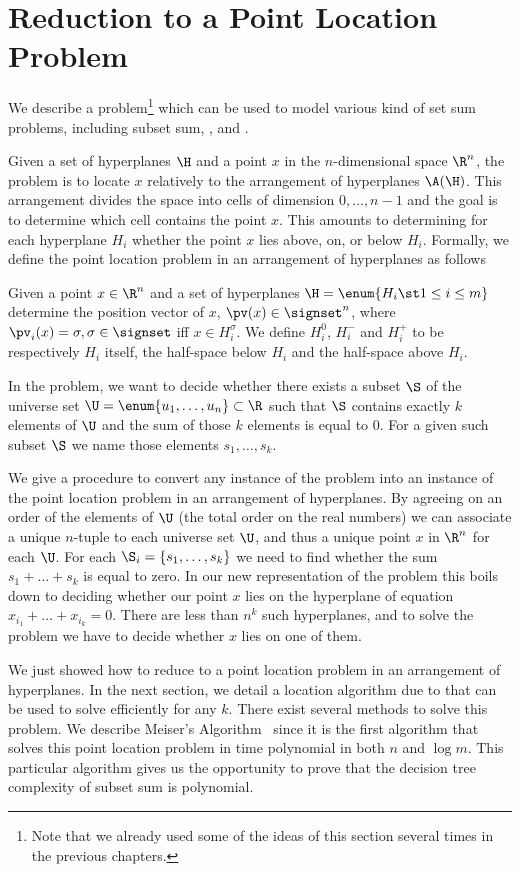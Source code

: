 \section{Reduction to a Point Location Problem}

We describe a problem\footnote{%
Note that we already used some of the ideas of this section several times in
the previous chapters.%
}
which can be used to model
various kind of set sum problems, including subset sum, \kSUM, and \kLDT.

Given a set of hyperplanes \(\H\) and a point \(x\) in the \(n\)-dimensional
space \(\R^n\), the problem is to locate \(x\) relatively
to the arrangement of hyperplanes \(\A(\H)\). This arrangement divides the space
into cells of dimension \(0,\ldots,n-1\) and the goal is to determine which
cell contains the point \(x\). This amounts to determining for each
hyperplane \(H_i\) whether the point \(x\) lies above, on, or below \(H_i\).
Formally, we define the point location problem in an arrangement of hyperplanes as
follows
\begin{problem}
Given a point $x \in \R^n$ and a set of hyperplanes $\H = \enum{ H_i
\st 1 \leq i \leq m }$ determine the position vector of $x$, $\pv(x) \in
\signset^n$, where $\pv_i(x) = \sigma, \sigma \in \signset$ iff $x \in
H_i^{\sigma}$. We define $H_i^{0}$, $H_i^{-}$ and $H_i^{+}$ to be
respectively $H_i$ itself, the half-space below $H_i$ and the half-space above
$H_i$.
\end{problem}
In the \kSUM problem, we want to decide whether there exists a subset \(\S\) of the
universe set \(\U = \enum{u_1,\ldots,u_n} \subset \R\) such that
$\S$
contains exactly $k$ elements of $\U$ and the sum of those $k$
elements is equal to $0$. For a given such subset $\S$ we name those elements
$s_1, \dots, s_k$.

We give a procedure to convert any instance of the \kSUM problem into an
instance of the point location problem in an arrangement of hyperplanes.
By agreeing on an order of the elements of $\U$ (\eg the total order on
the real numbers) we can associate a unique $n$-tuple to each universe set $\U$,
and thus a unique point $x$ in $\R^n$ for each $\U$.
For each $\S_i = \left\{s_1, \dots, s_k\right\}$ we need to find whether the sum $s_1
+ \dots + s_k$ is equal to zero. In our new representation of the problem this
boils down to deciding whether our point $x$ lies on the hyperplane of
equation $x_{i_1} + \dots + x_{i_k} = 0$. There are less than $n^k$ such
hyperplanes, and to solve the problem
we have to decide whether \(x\) lies on one of them.

We just showed how to reduce \kSUM to a
point location problem in an arrangement of hyperplanes. In the next section,
we detail a location algorithm due to \citet*{meiser:1993} that can be used to
solve \kSUM efficiently for any $k$. There exist several methods to solve
this problem. We describe Meiser's Algorithm~\cite{meiser:1993} since it
is the first algorithm that solves this point location problem in time
polynomial in both $n$ and $\log m$. This particular
algorithm gives us the opportunity to prove that the decision tree complexity
of subset sum is polynomial.

